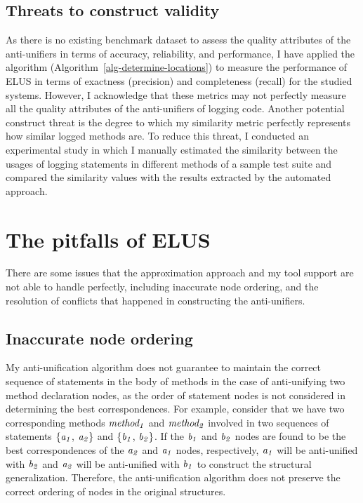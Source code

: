 \subsection{Threats to construct validity}  \label{construct_threats}
As there is no existing benchmark dataset to assess the quality attributes of the anti-unifiers in terms of accuracy, reliability, and performance, I have applied the  algorithm (Algorithm~\ref{alg-determine-locations}) to measure the performance of ELUS in terms of exactness (precision) and completeness (recall) for the studied systems. However, I acknowledge that these metrics may not perfectly measure all the quality attributes of the anti-unifiers of logging code. Another potential construct threat is the degree to which my similarity metric perfectly represents how similar logged methods are. To reduce this threat, I conducted an experimental study in which I manually estimated the similarity between the usages of logging statements in different methods of a sample test suite and compared the similarity values with the results extracted by the automated approach.



\section{The pitfalls of ELUS}  \label{limitations}
There are some issues that the approximation approach and my tool support are not able to handle perfectly, including inaccurate node ordering, and the resolution of conflicts that happened in constructing the anti-unifiers.


\subsection{Inaccurate node ordering}  \label{mismatch}
My anti-unification algorithm does not guarantee to maintain the correct sequence of statements in the body of methods in the case of anti-unifying two method declaration nodes, as the order of statement nodes is not considered in determining the best correspondences. For example, consider that we have two corresponding methods $\mathit{method_1}$ and $\mathit{method_2}$ involved in two sequences of statements $\{\mathit{a_1}$, $\mathit{a_2}\}$ and $\{\mathit{b_1}$, $\mathit{b_2}\}$. If the $\mathit{b_1}$ and $\mathit{b_2}$ nodes are found to be the best correspondences of the $\mathit{a_2}$ and $\mathit{a_1}$ nodes, respectively, $\mathit{a_1}$ will be anti-unified with $\mathit{b_2}$  and $\mathit{a_2}$ will be anti-unified with $\mathit{b_1}$ to construct the structural generalization. Therefore, the anti-unification algorithm does not preserve the correct ordering of nodes in the original structures.

